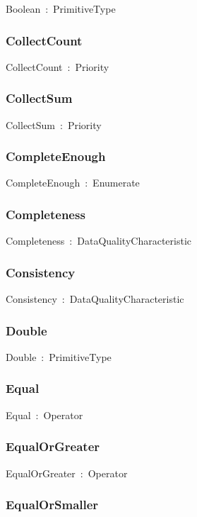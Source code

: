 \documentclass{article}
\begin{document}
Boolean~:~PrimitiveType

\subsubsection*{CollectCount}

CollectCount~:~Priority

\subsubsection*{CollectSum}

CollectSum~:~Priority

\subsubsection*{CompleteEnough}

CompleteEnough~:~Enumerate

\subsubsection*{Completeness}

Completeness~:~DataQualityCharacteristic

\subsubsection*{Consistency}

Consistency~:~DataQualityCharacteristic

\subsubsection*{Double}

Double~:~PrimitiveType

\subsubsection*{Equal}

Equal~:~Operator

\subsubsection*{EqualOrGreater}

EqualOrGreater~:~Operator

\subsubsection*{EqualOrSmaller}
\end{document}
